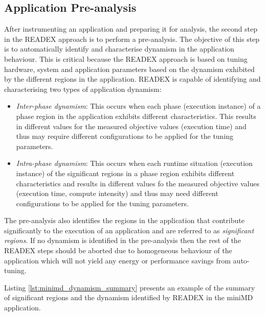 \subsection{Application Pre-analysis}
\label{sec:dynamism_detection}
After instrumenting an application and preparing it for analysis, the second step in the READEX approach is to perform a pre-analysis. The objective of this step is to automatically identify and characterise dynamism in the application behaviour. This is critical because the READEX approach is based on tuning hardware, system and application parameters based on the dynamism exhibited by the different regions in the application. READEX is capable of identifying and characterising two types of application dynamism:
\begin{itemize}
  \item \textit{Inter-phase dynamism}: This occurs when each phase (execution instance) of a phase region in the application exhibits different characteristics. This results in different values for the measured objective values (execution time) and thus may require different configurations to be applied for the tuning parameters.
  \item \textit{Intra-phase dynamism}: This occurs when each runtime situation (execution instance) of the significant regions in a phase region exhibits different characteristics and results in different values fo the measured objective values (execution time, compute intensity) and thus may need different configurations to be applied for the tuning parameters.
\end{itemize}
The pre-analysis also identifies the regions in the application that contribute significantly to the execution of an application and are referred to as \textit{significant regions}. If no dynamism is identified in the pre-analysis then the rest of the READEX steps should be aborted due to homogeneous behaviour of the application which will not yield any energy or performance savings from auto-tuning.

Listing \ref{lst:minimd_dynamism_summary} presents an example of the summary of significant regions and the dynamism identified by READEX in the miniMD application.

